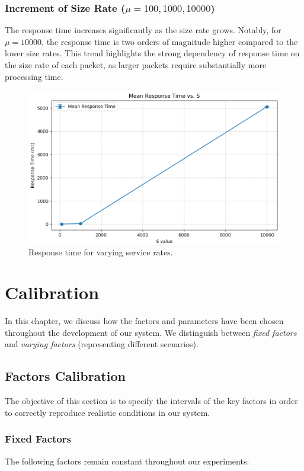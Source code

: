 \documentclass{report}
\begin{document}
\subsection{Increment of Size Rate ($\mu = 100, 1000, 10000$)}
The response time increases significantly as the size rate grows. Notably, for $\mu = 10000$, the response time is two orders of magnitude higher compared to the lower size rates. This trend highlights the strong dependency of response time on the size rate of each packet, as larger packets require substantially more processing time.

\begin{figure}[H]
    \centering
    \includegraphics[width=1\textwidth]{img/size_vary.png}
    \caption{Response time for varying service rates.}
\end{figure}

\chapter{Calibration}
In this chapter, we discuss how the factors and parameters have been chosen throughout the development of our system. We distinguish between \textit{fixed factors} and \textit{varying factors} (representing different scenarios).

\section{Factors Calibration}
The objective of this section is to specify the intervals of the key factors in order to correctly reproduce realistic conditions in our system.

\subsection{Fixed Factors}
The following factors remain constant throughout our experiments:
\end{document}
